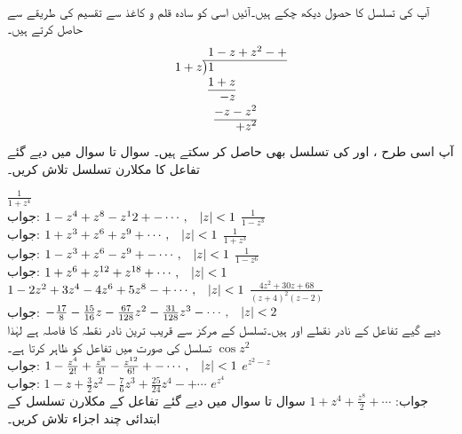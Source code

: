 \quad {}\\
آپ   کی تسلسل کا حصول دیکھ چکے ہیں۔آئیں اسی کو سادہ قلم و کاغذ سے تقسیم کی طریقے سے حاصل کرتے ہیں۔
\begin{align*}
\arraycolsep=0em
\begin{array}{rrrrrrr}
  & &\multicolumn{5}{l}{1-z+z^2-+}\\
\cline{2-7}
1+z&\big)&1&&&&\\
  & &\multicolumn{2}{r}{1+ z}&&&\\
\cline{3-4}
  & & &\multicolumn{1}{r}{-z}&&&\\
  & &&\multicolumn{2}{r}{ -z-z^2}&&\\
\cline{4-5}
  & &&&+z^2&&
\end{array}
\end{align*}
آپ اسی طرح ،  اور   کی تسلسل بھی حاصل کر سکتے ہیں۔
سوال  تا سوال  میں دیے گئے تفاعل کا مکلارن تسلسل تلاش کریں۔

\quad
$\tfrac{1}{1+z^4}$\\
جواب:\quad
$1-z^4+z^8-z^12+-\cdots,\quad \abs{z}<1$
\quad
$\tfrac{1}{1-z^3}$\\
جواب:\quad
$1+z^3+z^6+z^9+\cdots,\quad \abs{z}<1$
\quad
$\tfrac{1}{1+z^3}$\\
جواب:\quad
$1-z^3+z^6-z^9+-\cdots,\quad \abs{z}<1$
\quad
$\tfrac{1}{1-z^6}$\\
جواب:\quad
$1+z^6+z^{12}+z^{18}+\cdots,\quad \abs{z}<1$\\
$1-2z^2+3z^4-4z^6+5z^8-+\cdots,\quad \abs{z}<1$
\quad
$\tfrac{4z^2+30z+68}{(z+4)^2(z-2)}$\\
جواب:\quad
$-\tfrac{17}{8}-\tfrac{15}{16}z-\tfrac{67}{128}z^2-\tfrac{31}{128}z^3-\cdots,\quad \abs{z}<2$\\
دیے گیے تفاعل کے نادر نقطے   اور  ہیں۔تسلسل کے مرکز  سے قریب ترین نادر نقطہ کا فاصلہ  ہے لہٰذا تسلسل  کی صورت میں تفاعل کو ظاہر کرتا ہے۔ 
\quad 
$\cos z^2$\\
جواب:\quad
$1-\tfrac{z^4}{2!}+\tfrac{z^8}{4!}-\tfrac{z^{12}}{6!}+-\cdots, \quad \abs{z}<1$
\quad 
$e^{z^2-z}$\\
جواب:\quad
$1-z+\tfrac{3}{2}z^2-\tfrac{7}{6}z^3+\tfrac{25}{24}z^4-+\cdots $
\quad 
$e^{z^4}$\\
جواب:\quad
$1+z^4+\frac{z^8}{2}+\cdots $
سوال  تا سوال  میں دیے گئے تفاعل کے مکلارن تسلسل کے ابتدائی چند اجزاء تلاش کریں۔

